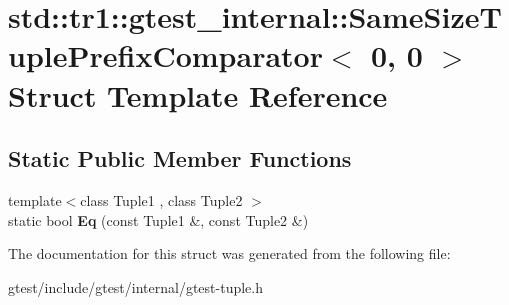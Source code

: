 \hypertarget{structstd_1_1tr1_1_1gtest__internal_1_1SameSizeTuplePrefixComparator_3_010_00_010_01_4}{}\section{std\+:\+:tr1\+:\+:gtest\+\_\+internal\+:\+:Same\+Size\+Tuple\+Prefix\+Comparator$<$ 0, 0 $>$ Struct Template Reference}
\label{structstd_1_1tr1_1_1gtest__internal_1_1SameSizeTuplePrefixComparator_3_010_00_010_01_4}
\subsection*{Static Public Member Functions}
\begin{DoxyCompactItemize}
\item 
\mbox{\label{structstd_1_1tr1_1_1gtest__internal_1_1SameSizeTuplePrefixComparator_3_010_00_010_01_4_a4f209822266c6bb1832c49750a11ef95}} 
{\footnotesize template$<$class Tuple1 , class Tuple2 $>$ }\\static bool {\bfseries Eq} (const Tuple1 \&, const Tuple2 \&)
\end{DoxyCompactItemize}


The documentation for this struct was generated from the following file\+:\begin{DoxyCompactItemize}
\item 
gtest/include/gtest/internal/gtest-\/tuple.\+h\end{DoxyCompactItemize}
